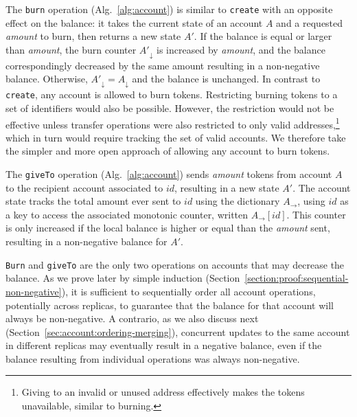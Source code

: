 \documentclass[9pt, oneside]{article}   	%
\begin{document}
The \texttt{burn} operation (Alg.~\ref{alg:account}) is similar to \texttt{create} with an opposite effect on the balance: it takes the current state of an account $A$ and a requested \textit{amount} to burn, then returns a new state $A'$. If the balance is equal or larger than \textit{amount}, the burn counter $A'_\downarrow$ is increased by \textit{amount}, and the balance correspondingly decreased by the same amount resulting in a non-negative balance. Otherwise, $A'_\downarrow = A_\downarrow$ and the balance is unchanged. In contrast to \texttt{create}, any account is allowed to burn tokens. Restricting burning tokens to a set of identifiers would also be possible. However, the restriction would not be effective unless transfer operations were also restricted to only valid addresses,\footnote{Giving to an invalid or unused address effectively makes the tokens unavailable, similar to burning.} which in turn would require tracking the set of valid accounts. We therefore take the simpler and more open approach of allowing any account to burn tokens. 

The \texttt{giveTo} operation (Alg.~\ref{alg:account}) sends \textit{amount} tokens from account $A$ to the recipient account associated to $id$, resulting in a new state $A'$. The account state tracks the total amount ever sent to $id$ using the dictionary $A_{\rightarrow}$, using $id$ as a key to access the associated monotonic counter, written $A_{\rightarrow}[id]$. This counter is only increased if the local balance is higher or equal than the \textit{amount} sent, resulting in a non-negative balance for $A'$.

\texttt{Burn} and \texttt{giveTo} are the only two operations on accounts that may decrease the balance. As we prove later by simple induction (Section~\ref{section:proof:sequential-non-negative}), it is sufficient to sequentially order all account operations, potentially across replicas, to guarantee that the balance for that account will always be non-negative. A contrario, as we also discuss next  (Section~\ref{sec:account:ordering-merging}), concurrent updates to the same account in different replicas may eventually result in a negative balance, even if the balance resulting from individual operations was always non-negative.
\end{document}
